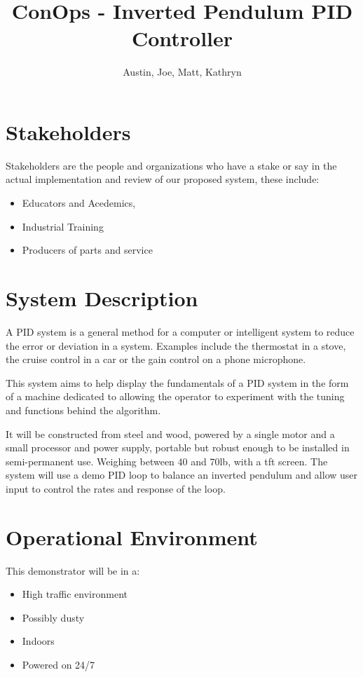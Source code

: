 \documentclass{article}
\title{ConOps - Inverted Pendulum PID Controller}       %
\author{Austin, Joe, Matt, Kathryn}                     %
\begin{document}
\maketitle %


\section{Stakeholders}

Stakeholders are the people and organizations who have a stake or say in the actual
implementation and review of our proposed system, these include:

\begin{itemize}
    \item Educators and Acedemics,
    \item Industrial Training
    \item Producers of parts and service
\end{itemize}


\section{System Description}

A PID system is a general method for a computer or intelligent system to reduce the error
or deviation in a system. Examples include the thermostat in a stove, the cruise control in a
car or the gain control on a phone microphone.

This system aims to help display the fundamentals of a PID system in the form of a machine dedicated
to allowing the operator to experiment with the tuning and functions behind the algorithm.

It will be constructed from steel and wood, powered by a single motor and a small processor
and power supply, portable but robust enough to be installed in semi-permanent use.
Weighing between 40 and 70lb, with a tft screen. The system will use a demo PID loop to
balance an inverted pendulum and allow user input to control the rates and response of the loop.


\section{Operational Environment}

This demonstrator will be in a:

\begin{itemize}
    \item High traffic environment
    \item Possibly dusty
    \item Indoors
    \item Powered on 24/7
\end{itemize}
\end{document}
